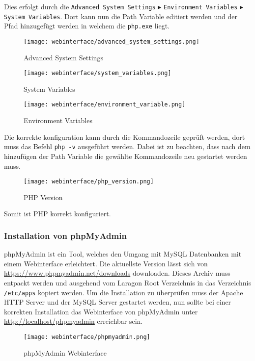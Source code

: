 Dies erfolgt durch die \verb|Advanced System Settings| $\blacktriangleright$
\verb|Environment Variables| $\blacktriangleright$ \verb|System Variables|.
Dort kann nun die Path Variable editiert werden und der Pfad hinzugefügt werden
in welchem die \verb|php.exe| liegt.

\begin{figure}[H]
  \centering
  \texttt{[image: webinterface/advanced\_system\_settings.png]}
  \caption{Advanced System Settings}
\end{figure}

\begin{figure}[H]
  \centering
  \texttt{[image: webinterface/system\_variables.png]}
  \caption{System Variables}
\end{figure}

\begin{figure}[H]
  \centering
  \texttt{[image: webinterface/environment\_variable.png]}
  \caption{Environment Variables}
\end{figure}

Die korrekte konfiguration kann durch die Kommandozeile geprüft werden, dort
muss das Befehl \verb|php -v| ausgeführt werden. Dabei ist zu beachten, dass
nach dem hinzufügen der Path Variable die gewählte Kommandozeile neu gestartet
werden muss.

\begin{figure}[H]
  \centering
  \texttt{[image: webinterface/php\_version.png]}
  \caption{PHP Version}
\end{figure}

Somit ist PHP korrekt konfiguriert.

\subsubsection{Installation von phpMyAdmin}
phpMyAdmin ist ein Tool, welches den Umgang mit MySQL Datenbanken mit einem
Webinterface erleichtert. Die aktuellste Version lässt sich von
\url{https://www.phpmyadmin.net/downloads} downloaden. Dieses Archiv muss
entpackt werden und ausgehend vom Laragon Root Verzeichnis in das Verzeichnis
\verb|/etc/apps| kopiert werden. Um die Installation zu überprüfen muss der
Apache HTTP Server und der MySQL Server gestartet werden, nun sollte bei einer
korrekten Installation das Webinterface von phpMyAdmin unter
\url{http://localhost/phpmyadmin} erreichbar sein.

\begin{figure}[H]
  \centering
  \texttt{[image: webinterface/phpmyadmin.png]}
  \caption{phpMyAdmin Webinterface}
\end{figure}

